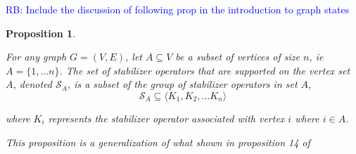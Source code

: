 \documentclass{article}
\newtheorem{prop}[theorem]{Proposition}
\newcommand{\rb}[1]{{\textcolor{blue}{RB: #1}}}
\begin{document}
    


\rb{Include the discussion of following prop  in the introduction to graph states}
\begin{prop}
\label{prop:support_stabilizer_subset_of_group_of_stablizer_operator}

For any graph $ G = (V, E) $, let $ A \subseteq V $ be a subset of vertices of size $n$, ie $A = \{1, \dots n\}$. The set of stabilizer operators that are supported on the vertex set $ A $, denoted $ \mathcal{S}_A $, is a subset of the  group of stabilizer operators in set $A$, 
\begin{equation}
\label{eq:support_stabilizer_subset_of_group_of_stablizer_operator}
\mathcal{S}_A \subseteq \langle K_1, K_2, \dots K_n \rangle
\end{equation}

where $K_i$  represents the stabilizer operator associated with vertex $i$ where $i \in A $.

This proposition is a generalization of what shown in proposition 14 of \cite{hein2006entanglement}
\end{prop}
\end{document}
